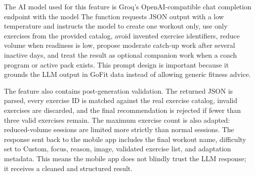\documentclass[12pt,a4paper,openany]{report}
\begin{document}
The AI model used for this feature is Groq's OpenAI-compatible chat completion endpoint with the model  The function requests JSON output with a low temperature and instructs the model to create one workout only, use only exercises from the provided catalog, avoid invented exercise identifiers, reduce volume when readiness is low, propose moderate catch-up work after several inactive days, and treat the result as optional companion work when a coach program or active pack exists. This prompt design is important because it grounds the LLM output in GoFit data instead of allowing generic fitness advice.


The feature also contains post-generation validation. The returned JSON is parsed, every exercise ID is matched against the real exercise catalog, invalid exercises are discarded, and the final recommendation is rejected if fewer than three valid exercises remain. The maximum exercise count is also adapted: reduced-volume sessions are limited more strictly than normal sessions. The response sent back to the mobile app includes the final workout name, difficulty set to Custom, focus, reason, image, validated exercise list, and adaptation metadata. This means the mobile app does not blindly trust the LLM response; it receives a cleaned and structured result.
\end{document}
